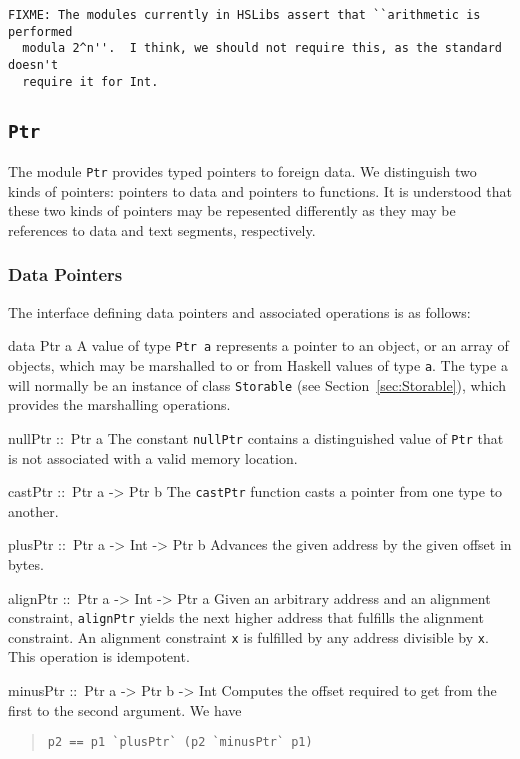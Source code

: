 \documentclass[a4paper,twosides]{article}
\makeatletter
\newcommand{\code}[1]{\texttt{#1}}      %
\newenvironment{codedesc}{%
  \list{}{\labelwidth\z@ \itemindent-\leftmargin
    \let\makelabel\codedesclabel}
  }{%
  \endlist
  }
\newcommand*{\codedesclabel}[1]{\hspace\labelsep\normalfont\code{#1}}
\makeatother
\begin{document}
\begin{verbatim}
FIXME: The modules currently in HSLibs assert that ``arithmetic is performed
  modula 2^n''.  I think, we should not require this, as the standard doesn't
  require it for Int.
\end{verbatim}

\subsection{\code{Ptr}}

The module \code{Ptr} provides typed pointers to foreign data.  We distinguish
two kinds of pointers: pointers to data and pointers to functions.  It is
understood that these two kinds of pointers may be repesented differently as
they may be references to data and text segments, respectively.

\subsubsection{Data Pointers}

The interface defining data pointers and associated operations is as follows:
%
\begin{codedesc}
\item[data Ptr a] A value of type \code{Ptr a} represents a pointer to an
  object, or an array of objects, which may be marshalled to or from Haskell
  values of type \code{a}.  The type a will normally be an instance of class
  \code{Storable} (see Section~\ref{sec:Storable}), which provides the
  marshalling operations.
\item[nullPtr ::\ Ptr a] The constant \code{nullPtr} contains a distinguished
  value of \code{Ptr} that is not associated with a valid memory location.
\item[castPtr ::\ Ptr a -> Ptr b] The \code{castPtr} function casts a pointer
  from one type to another.
\item[plusPtr ::\ Ptr a -> Int -> Ptr b] Advances the given address by the
  given offset in bytes.
\item[alignPtr ::\ Ptr a -> Int -> Ptr a] Given an arbitrary address and an
  alignment constraint, \code{alignPtr} yields the next higher address that
  fulfills the alignment constraint. An alignment constraint \code{x} is
  fulfilled by any address divisible by \code{x}. This operation is
  idempotent.
\item[minusPtr ::\ Ptr a -> Ptr b -> Int] Computes the offset required to get
  from the first to the second argument.  We have
  \begin{quote}
\begin{verbatim}
p2 == p1 `plusPtr` (p2 `minusPtr` p1)
\end{verbatim}
  \end{quote}
\end{codedesc}
\end{document}
